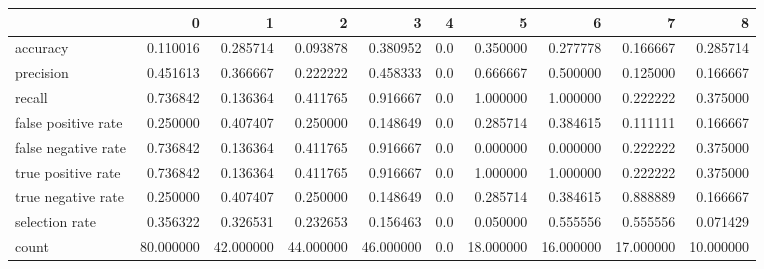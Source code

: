 \begin{tabular}{lrrrrrrrrr}
\toprule
{} &          0 &          1 &          2 &          3 &    4 &          5 &          6 &          7 &          8 \\
\midrule
accuracy            &   0.110016 &   0.285714 &   0.093878 &   0.380952 &  0.0 &   0.350000 &   0.277778 &   0.166667 &   0.285714 \\
precision           &   0.451613 &   0.366667 &   0.222222 &   0.458333 &  0.0 &   0.666667 &   0.500000 &   0.125000 &   0.166667 \\
recall              &   0.736842 &   0.136364 &   0.411765 &   0.916667 &  0.0 &   1.000000 &   1.000000 &   0.222222 &   0.375000 \\
false positive rate &   0.250000 &   0.407407 &   0.250000 &   0.148649 &  0.0 &   0.285714 &   0.384615 &   0.111111 &   0.166667 \\
false negative rate &   0.736842 &   0.136364 &   0.411765 &   0.916667 &  0.0 &   0.000000 &   0.000000 &   0.222222 &   0.375000 \\
true positive rate  &   0.736842 &   0.136364 &   0.411765 &   0.916667 &  0.0 &   1.000000 &   1.000000 &   0.222222 &   0.375000 \\
true negative rate  &   0.250000 &   0.407407 &   0.250000 &   0.148649 &  0.0 &   0.285714 &   0.384615 &   0.888889 &   0.166667 \\
selection rate      &   0.356322 &   0.326531 &   0.232653 &   0.156463 &  0.0 &   0.050000 &   0.555556 &   0.555556 &   0.071429 \\
count               &  80.000000 &  42.000000 &  44.000000 &  46.000000 &  0.0 &  18.000000 &  16.000000 &  17.000000 &  10.000000 \\
\bottomrule
\end{tabular}
